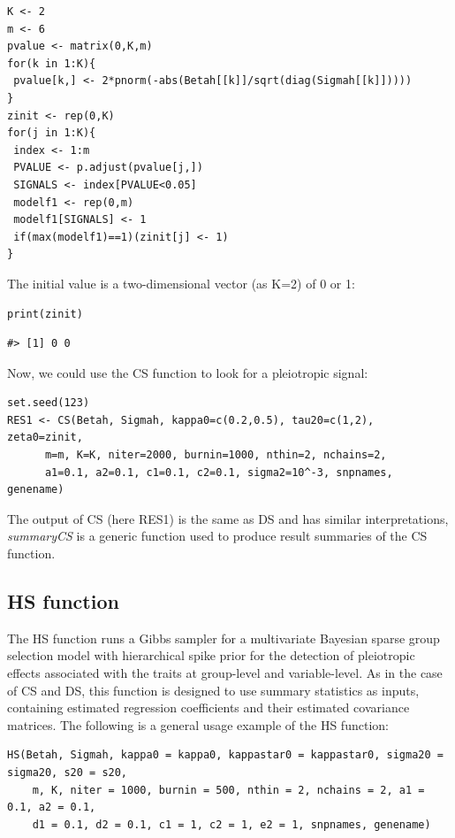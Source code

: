 \begin{verbatim}
K <- 2
m <- 6
pvalue <- matrix(0,K,m)
for(k in 1:K){
 pvalue[k,] <- 2*pnorm(-abs(Betah[[k]]/sqrt(diag(Sigmah[[k]]))))
}
zinit <- rep(0,K)
for(j in 1:K){
 index <- 1:m
 PVALUE <- p.adjust(pvalue[j,])
 SIGNALS <- index[PVALUE<0.05]
 modelf1 <- rep(0,m)
 modelf1[SIGNALS] <- 1
 if(max(modelf1)==1)(zinit[j] <- 1)
}
\end{verbatim}

The initial value is a two-dimensional vector (as K=2) of 0 or 1:

\begin{verbatim}
print(zinit)
\end{verbatim}

\begin{verbatim}
#> [1] 0 0
\end{verbatim}

Now, we could use the CS function to look for a pleiotropic signal:

\begin{verbatim}
set.seed(123)
RES1 <- CS(Betah, Sigmah, kappa0=c(0.2,0.5), tau20=c(1,2), zeta0=zinit,
      m=m, K=K, niter=2000, burnin=1000, nthin=2, nchains=2,
      a1=0.1, a2=0.1, c1=0.1, c2=0.1, sigma2=10^-3, snpnames, genename)
\end{verbatim}

The output of CS (here RES1) is the same as DS and has similar interpretations, \emph{summaryCS} is a generic function used to produce result summaries of the CS function.

\hypertarget{hs-function}{%
\subsection{HS function}\label{hs-function}}

The HS function runs a Gibbs sampler for a multivariate Bayesian sparse group selection model with hierarchical spike prior for the detection of pleiotropic effects associated with the traits at group-level and variable-level. As in the case of
CS and DS, this function is designed to use summary statistics as inputs, containing estimated regression coefficients and their estimated covariance matrices. The following is a general usage example of the HS function:

\begin{verbatim}
HS(Betah, Sigmah, kappa0 = kappa0, kappastar0 = kappastar0, sigma20 = sigma20, s20 = s20,
    m, K, niter = 1000, burnin = 500, nthin = 2, nchains = 2, a1 = 0.1, a2 = 0.1,
    d1 = 0.1, d2 = 0.1, c1 = 1, c2 = 1, e2 = 1, snpnames, genename)
\end{verbatim}

